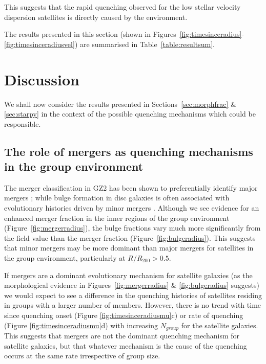 \documentclass[useAMS,usenatbib]{mn2e}
\begin{document}
This suggests that the rapid quenching observed for the low stellar velocity dispersion satellites is directly caused by the environment. 

The results presented in this section (shown in Figures~\ref{fig:timesinceradius}-\ref{fig:timesinceradiusvel}) are summarised in Table~\ref{table:resultsum}.

\section{Discussion}\label{sec:disc}

We shall now consider the results presented in Sections~\ref{sec:morphfrac} \& \ref{sec:starpy} in the context of the possible quenching mechanisms which could be responsible. 

\subsection{The role of mergers as quenching mechanisms in the group environment}\label{sec:rolemergerenv}

The merger classification in GZ2 has been shown to preferentially identify major mergers \citep{Darg10a}; while bulge formation in disc galaxies is often associated with evolutionary histories driven by minor mergers \citep{Croton06, tonini16}.  Although we see evidence for an enhanced merger fraction in the inner regions of the group environment (Figure~\ref{fig:mergerradius}), the bulge fractions vary much more significantly from the field value than the merger fraction (Figure~\ref{fig:bulgeradius}). This suggests that minor mergers may be more dominant than major mergers for satellites in the group environment, particularly at $R/R_{200} > 0.5$. 

If mergers are a dominant evolutionary mechanism for satellite galaxies (as the morphological evidence in Figures~\ref{fig:mergerradius} \& \ref{fig:bulgeradius} suggests) we would expect to see a difference in the quenching histories of satellites residing in groups with a larger number of members. However, there is no trend with time since quenching onset (Figure \ref{fig:timesinceradiusmu}c) or rate of quenching (Figure \ref{fig:timesinceradiusmu}d) with increasing $N_{group}$ for the satellite galaxies. This suggests that mergers are not the dominant quenching mechanism for satellite galaxies, but that whatever mechanism is the cause of the quenching occurs at the same rate irrespective of group size. 
\end{document}
